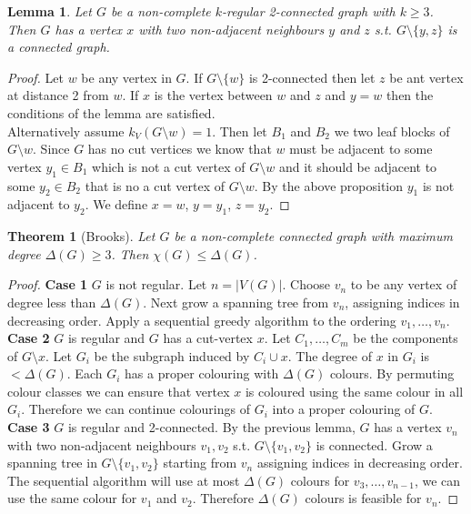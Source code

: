 \documentclass{article}
\newtheorem*{thm}{Theorem}
\newtheorem*{lem}{Lemma}
\theoremstyle{definition}
\begin{document}
\begin{lem}
Let $G$ be a non-complete $k$-regular 2-connected graph with $k \ge 3$.
Then $G$ has a vertex $x$ with two non-adjacent neighbours $y$ and $z$ s.t. $G\setminus \{y,z\}$ is a connected graph.
\end{lem}

\begin{proof}
Let $w$ be any vertex in $G$. If $G\setminus\{w\}$ is 2-connected then let $z$ be ant vertex at distance 2 from $w$.
If $x$ is the vertex between $w$ and $z$ and $y = w$ then the conditions of the lemma are satisfied. \\
Alternatively assume $k_V(G\setminus w) = 1$.
Then let $B_1$ and $B_2$ we two leaf blocks of $G\setminus w$.
Since $G$ has no cut vertices we know that $w$ must be adjacent to some vertex $y_1 \in B_1$ which is not a cut vertex of $G\setminus w$ and it should be adjacent to some $y_2 \in B_2$ that is no a cut vertex of $G\setminus w$.
By the above proposition $y_1$ is not adjacent to $y_2$.
We define $x = w$, $y = y_1$, $z = y_2$.
\end{proof}

\begin{thm}[Brooks]
Let $G$ be a non-complete connected graph with maximum degree $\Delta(G) \ge 3$.
Then $\chi(G) \le \Delta(G)$.
\end{thm}

\begin{proof}
\textbf{Case 1} $G$ is not regular.
Let $n = |V(G)|$.
Choose $v_n$ to be any vertex of degree less than $\Delta(G)$.
Next grow a spanning tree from $v_n$, assigning indices in decreasing order.
Apply a sequential greedy algorithm to the ordering $v_1,\ldots,v_n$. \\
\textbf{Case 2} $G$ is regular and $G$ has a cut-vertex $x$.
Let $C_1,\ldots, C_m$ be the components of $G\setminus x$.
Let $G_i$ be the subgraph induced by $C_i\cup x$.
The degree of $x$ in $G_i$ is $< \Delta(G)$.
Each $G_i$ has a proper colouring with $\Delta(G)$ colours.
By permuting colour classes we can ensure that vertex $x$ is coloured using the same colour in all $G_i$.
Therefore we can continue colourings of $G_i$ into a proper colouring of $G$. \\
\textbf{Case 3} $G$ is regular and 2-connected.
By the previous lemma, $G$ has a vertex $v_n$ with two non-adjacent neighbours $v_1, v_2$ s.t. $G\setminus\{v_1,v_2\}$ is connected.
Grow a spanning tree in $G\setminus \{v_1,v_2\}$ starting from $v_n$ assigning indices in decreasing order.
The sequential algorithm will use at most $\Delta(G)$ colours for $v_3,\ldots, v_{n-1}$, we can use the same colour for $v_1$ and $v_2$.
Therefore $\Delta(G)$ colours is feasible for $v_n$.
\end{proof}
\end{document}
